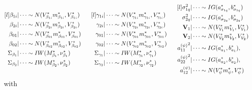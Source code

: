 \documentclass[alpha-refs]{wiley-article}
\newcommand{\bV}{\textbf{V}}
\begin{document}
\begin{equation*}
\begin{aligned}[l]
\beta_{1i} | \cdots &\sim N(V_{\beta_{1i} }^* m_{\beta_{1i} }^* , V_{\beta_{1i} }^*) \\
\beta_{2i} | \cdots &\sim N(V_{\beta_{2i} }^* m_{\beta_{2i} }^* , V_{\beta_{2i} }^*) \\
\beta_{01} | \cdots &\sim N(V_{\beta_{01} }^* m_{\beta_{01} }^* , V_{\beta_{01} }^*) \\
\beta_{02} | \cdots &\sim N(V_{\beta_{02} }^* m_{\beta_{02} }^* , V_{\beta_{02} }^*) \\
\Sigma_{\beta_{1}} | \cdots &\sim IW(M_{\beta_{1}}^*,\nu^*_{\beta_{1}}) \\
\Sigma_{\beta_{2}}  | \cdots &\sim IW(M_{\beta_{2}}^*,\nu_{\beta_{2}}^*)
\end{aligned}
\hspace{6mm}
\begin{aligned}[l]
\gamma_{1i} | \cdots &\sim N(V_{\gamma_{1i} }^* m_{\gamma_{1i} }^* , V_{\gamma_{1i} }^*) \\
\gamma_{2i} | \cdots &\sim N(V_{\gamma_{2i} }^* m_{\gamma_{2i} }^* , V_{\gamma_{2i} }^*) \\
\gamma_{01} | \cdots &\sim N(V_{\gamma_{01} }^* m_{\gamma_{01} }^* , V_{\gamma_{01} }^*) \\
\gamma_{02} | \cdots &\sim N(V_{\gamma_{02} }^* m_{\gamma_{02} }^* , V_{\gamma_{02} }^*) \\
\Sigma_{\gamma_{1}} | \cdots &\sim IW(M_{\gamma_1}^*,\nu^*_{\gamma_1}) \\
\Sigma_{\gamma_{2}}  | \cdots &\sim IW(M_{\gamma_2}^*,\nu_{\gamma_2}^*)
\end{aligned}
\hspace{6mm}
\begin{aligned}[l]
\sigma^2_{1 q} | \cdots &\sim IG(a^*_{\sigma_{1 q}},b^*_{\sigma_{1 q} }) \\
\sigma^2_{2q} | \cdots &\sim IG(a^*_{\sigma_{2q}},b^*_{\sigma_{2q}}) \\
\bV_1 | \cdots &\sim N(V_{V_1}^* m_{V_1}^* , V_{V_1}^*) \\
\bV_2 | \cdots &\sim N(V_{V_2}^* m_{V_2}^* , V_{V_2}^*) \\
{a^{(\psi)}_{11}}^2  | \cdots &\sim IG(a_{a_1}^*,b_{a_1}^*), \\
{a^{(\psi)}_{22}}^2 | \cdots   &\sim IG(a_{a_2}^*,b_{a_2}^*), \\
a^{(\psi)}_{12} | \cdots &\sim N(V_{\psi}^* m_{\psi}^* , V_{\psi}^*)  \\
\end{aligned}
\end{equation*}
with
\end{document}
